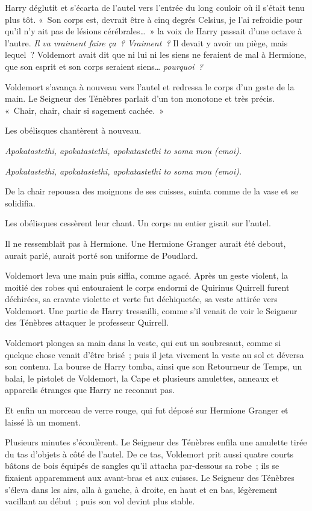Harry déglutit et s'écarta de l'autel vers l'entrée du long couloir où il s'était tenu plus tôt. «~Son corps est, devrait être à cinq degrés Celsius, je l'ai refroidie pour qu'il n'y ait pas de lésions cérébrales…~» la voix de Harry passait d'une octave à l'autre. \emph{Il va vraiment faire ça~? Vraiment~?} Il devait y avoir un piège, mais lequel~? Voldemort avait dit que ni lui ni les siens ne feraient de mal à Hermione, que son esprit et son corps seraient siens… \emph{pourquoi~?}

Voldemort s'avança à nouveau vers l'autel et redressa le corps d'un geste de la main. Le Seigneur des Ténèbres parlait d'un ton monotone et très précis. «~Chair, chair, chair si sagement cachée.~»

Les obélisques chantèrent à nouveau.

\emph{Apokatastethi, apokatastethi, apokatastethi to soma mou (emoi).}

\emph{Apokatastethi, apokatastethi, apokatastethi to soma mou (emoi).}

De la chair repoussa des moignons de ses cuisses, suinta comme de la vase et se solidifia.

Les obélisques cessèrent leur chant. Un corps nu entier gisait sur l'autel.

Il ne ressemblait pas à Hermione. Une Hermione Granger aurait été debout, aurait parlé, aurait porté son uniforme de Poudlard.

Voldemort leva une main puis siffla, comme agacé. Après un geste violent, la moitié des robes qui entouraient le corps endormi de Quirinus Quirrell furent déchirées, sa cravate violette et verte fut déchiquetée, sa veste attirée vers Voldemort. Une partie de Harry tressailli, comme s'il venait de voir le Seigneur des Ténèbres attaquer le professeur Quirrell.

Voldemort plongea sa main dans la veste, qui eut un soubresaut, comme si quelque chose venait d'être brisé~; puis il jeta vivement la veste au sol et déversa son contenu. La bourse de Harry tomba, ainsi que son Retourneur de Temps, un balai, le pistolet de Voldemort, la Cape et plusieurs amulettes, anneaux et appareils étranges que Harry ne reconnut pas.

Et enfin un morceau de verre rouge, qui fut déposé sur Hermione Granger et laissé là un moment.

Plusieurs minutes s'écoulèrent. Le Seigneur des Ténèbres enfila une amulette tirée du tas d'objets à côté de l'autel. De ce tas, Voldemort prit aussi quatre courts bâtons de bois équipés de sangles qu'il attacha par-dessous sa robe~; ils se fixaient apparemment aux avant-bras et aux cuisses. Le Seigneur des Ténèbres s'éleva dans les airs, alla à gauche, à droite, en haut et en bas, légèrement vacillant au début~; puis son vol devint plus stable.

